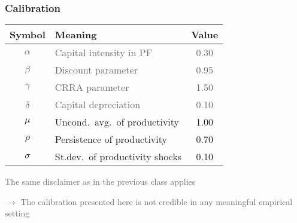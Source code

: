 \documentclass[10pt, aspectratio=1610, handout]{beamer}
\newcommand{\dimmer}[1]{\textcolor{dimgray}{#1}}
\begin{document}
  \begin{frame}
    \frametitle{Calibration}

    \begin{table}
      \centering
      \begin{tabular}{clc}
        \toprule
        Symbol   & Meaning                     & Value \\
        \midrule
        \dimmer{$\alpha$} & \dimmer{Capital intensity in PF}     & \dimmer{0.30}  \\
        \dimmer{$\beta$ } & \dimmer{Discount parameter     }     & \dimmer{0.95}  \\
        \dimmer{$\gamma$} & \dimmer{CRRA parameter         }     & \dimmer{1.50}  \\
        \dimmer{$\delta$} & \dimmer{Capital depreciation   }     & \dimmer{0.10}  \\
        $\mu$    & Uncond.~avg.~of productivity   & 1.00  \\
        $\rho$   & Persistence of productivity    & 0.70  \\
        $\sigma$ & St.dev.~of productivity shocks & 0.10  \\
        \bottomrule
      \end{tabular}
    \end{table}

    \vfill

    \dimmer{The same disclaimer as in the previous class applies}

    \dimmer{$\to$ The calibration presented here is not credible in any meaningful empirical setting}

  \end{frame}
\end{document}

